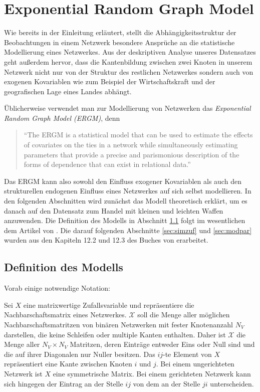 \documentclass[a4paper,ngerman,oneside,titlepage,bibliography=totoc,11pt]{scrreprt}
\begin{document}
\chapter{Exponential Random Graph Model}
 Wie bereits in der Einleitung erläutert, stellt die Abhängigkeitsstruktur der Beobachtungen in einem Netzwerk besondere Ansprüche an die statistische Modellierung eines Netzwerkes. Aus der deskriptiven Analyse unseres Datensatzes geht außerdem hervor, dass die Kantenbildung zwischen zwei Knoten in unserem Netzwerk nicht nur von der Struktur des restlichen Netzwerkes sondern auch von exogenen Kovariablen wie zum Beispiel der Wirtschaftskraft und der geografischen Lage eines Landes abhängt.

Üblicherweise verwendet man zur Modellierung von Netzwerken das \emph{Exponential Random Graph Model (ERGM)}, denn
\begin{quote}
"`The ERGM is a statistical model that can be used to estimate the effects of covariates on the ties in a network while simultaneously estimating parameters that provide a precise and parismonious description of the forms of dependence that can exist in relational data."' \citep{cranmer2011inferential}
\end{quote}
Das ERGM kann also sowohl den Einfluss exogener Kovariablen als auch den strukturellen endogenen Einfluss eines Netzwerkes auf sich selbst modellieren. In den folgenden Abschnitten wird zunächst das Modell theoretisch erklärt, um es danach auf den Datensatz zum Handel mit kleinen und leichten Waffen anzuwenden. Die Definition des Modells in Abschnitt \ref{sec:defmod} folgt im wesentlichen dem Artikel von \citet{hunter2008ergm}. Die darauf folgenden Abschnitte \ref{sec:simzuf} und \ref{sec:modpar} wurden aus den Kapiteln 12.2 und 12.3 des Buches von \citet{lkr12} erarbeitet.

\section{Definition des Modells}
\label{sec:defmod}
Vorab einige notwendige Notation:

Sei $X$ eine matrixwertige Zufallsvariable und repräsentiere die Nachbarschaftsmatrix eines Netzwerkes. $\mathcal{X}$ soll die Menge aller möglichen Nachbarschaftsmatritzen von binären Netzwerken mit fester Knotenanzahl $N_V$ darstellen, die keine Schleifen oder multiple Kanten enthalten. Daher ist $\mathcal{X}$ die Menge aller $N_V \times N_V$ Matritzen, deren Einträge entweder Eins oder Null sind und die auf ihrer Diagonalen nur Nuller besitzen. Das $ij$-te Element von $X$ repräsentiert eine Kante zwischen Knoten $i$ und $j$. Bei einem ungerichteten Netzwerk ist $X$ eine symmetrische Matrix. Bei einem gerichteten Netzwerk kann sich hingegen der Eintrag an der Stelle $ij$ von dem an der Stelle $ji$ unterscheiden.
\end{document}
